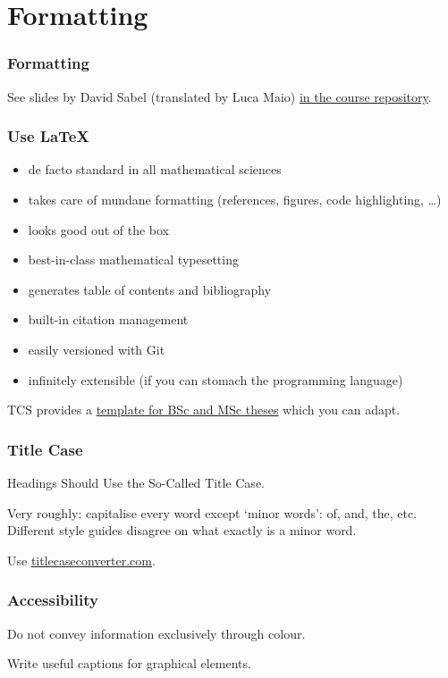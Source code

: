 \documentclass[xetex]{beamer}
\begin{document}
\section{Formatting}

\begin{frame}
  \frametitle{Formatting}

  See slides by David Sabel (translated by Luca Maio) \href{https://github.com/JLimperg/dtt-seminar-2024/}{in the course repository}.
\end{frame}

\begin{frame}
  \frametitle{Use \LaTeX}

  \begin{itemize}[<+->]
    \item de facto standard in all mathematical sciences
    \item takes care of mundane formatting (references, figures, code highlighting, \dots)
    \item looks good out of the box
    \item best-in-class mathematical typesetting
    \item generates table of contents and bibliography
    \item built-in citation management
    \item easily versioned with Git
    \item infinitely extensible (if you can stomach the programming language)
  \end{itemize}

  \medskip
  \pause

  TCS provides a \href{https://www.tcs.ifi.lmu.de/lehre/bsc-master-arbeiten_de.html}{template for BSc and MSc theses} which you can adapt.
\end{frame}

\begin{frame}
  \frametitle{Title Case}

  Headings Should Use the So-Called Title Case.

  \medskip

  Very roughly: capitalise every word except \enquote*{minor words}: of, and, the, etc.
  Different style guides disagree on what exactly is a minor word.

  \medskip
  \pause

  Use \url{titlecaseconverter.com}.
\end{frame}

\begin{frame}
  \frametitle{Accessibility}

  Do not convey information exclusively through colour.

  \medskip
  \pause

  Write useful captions for graphical elements.
\end{frame}
\end{document}
